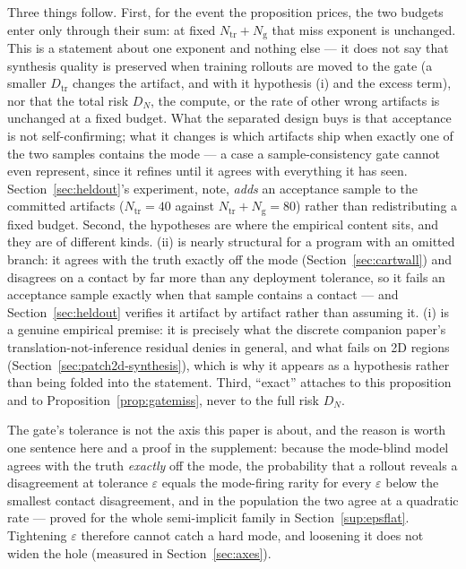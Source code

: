 \documentclass[11pt]{article}
\theoremstyle{definition}
\theoremstyle{remark}
\begin{document}
Three things follow. First, for the event the proposition prices, the two budgets enter only through their sum: at fixed $N_{\mathrm{tr}} + N_{\mathrm{g}}$ that miss exponent is unchanged. This is a statement about one exponent and nothing else --- it does not say that synthesis quality is preserved when training rollouts are moved to the gate (a smaller $D_{\mathrm{tr}}$ changes the artifact, and with it hypothesis (i) and the excess term), nor that the total risk $D_N$, the compute, or the rate of other wrong artifacts is unchanged at a fixed budget. What the separated design buys is that acceptance is not self-confirming; what it changes is which artifacts ship when exactly one of the two samples contains the mode --- a case a sample-consistency gate cannot even represent, since it refines until it agrees with everything it has seen. Section~\ref{sec:heldout}'s experiment, note, \emph{adds} an acceptance sample to the committed artifacts ($N_{\mathrm{tr}} = 40$ against $N_{\mathrm{tr}} + N_{\mathrm{g}} = 80$) rather than redistributing a fixed budget. Second, the hypotheses are where the empirical content sits, and they are of different kinds. (ii) is nearly structural for a program with an omitted branch: it agrees with the truth exactly off the mode (Section~\ref{sec:cartwall}) and disagrees on a contact by far more than any deployment tolerance, so it fails an acceptance sample exactly when that sample contains a contact --- and Section~\ref{sec:heldout} verifies it artifact by artifact rather than assuming it. (i) is a genuine empirical premise: it is precisely what the discrete companion paper's translation-not-inference residual denies in general, and what fails on 2D regions (Section~\ref{sec:patch2d-synthesis}), which is why it appears as a hypothesis rather than being folded into the statement. Third, ``exact'' attaches to this proposition and to Proposition~\ref{prop:gatemiss}, never to the full risk $D_N$.

The gate's tolerance is not the axis this paper is about, and the reason is worth one sentence here and a proof in the supplement: because the mode-blind model agrees with the truth \emph{exactly} off the mode, the probability that a rollout reveals a disagreement at tolerance $\varepsilon$ equals the mode-firing rarity for every $\varepsilon$ below the smallest contact disagreement, and in the population the two agree at a quadratic rate --- proved for the whole semi-implicit family in Section~\ref{sup:epsflat}. Tightening $\varepsilon$ therefore cannot catch a hard mode, and loosening it does not widen the hole (measured in Section~\ref{sec:axes}).
\end{document}
